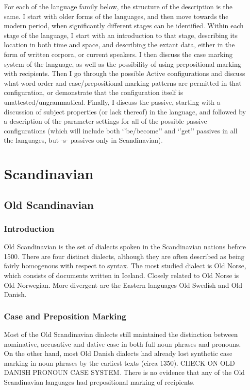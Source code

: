 For each of the language family below, the structure of the description is the same. I start with older forms of the languages, and then move towards the modern period, when significantly different stages can be identified. Within each stage of the language, I start with an introduction to that stage, describing its location in both time and space, and describing the extant data, either in the form of written corpora, or current speakers. I then discuss the case marking system of the language, as well as the possibility of using prepositional marking with recipients. Then I go through the possible Active configurations and discuss what word order and case/prepositional marking patterns are permitted in that configuration, or demonstrate that the configuration itself is unattested/ungrammatical. Finally, I discuss the passive, starting with a discussion of subject properties (or lack thereof) in the language, and followed by a description of the parameter settings for all of the possible passive configurations (which will include both `'be/become'' and `'get'' passives in all the languages, but -s- passives only in Scandinavian).
\chapter{Scandinavian}
\section{Old Scandinavian}\label{sec:OldScand}

\subsection{Introduction}
Old Scandinavian is the set of dialects spoken in the Scandinavian nations before 1500. There are four distinct dialects, although they are often described as being fairly homogenous with respect to syntax. The most studied dialect is Old Norse, which consists of documents written in Iceland. Closely related to Old Norse is Old Norwegian. More divergent are the Eastern languages Old Swedish and Old Danish.
\subsection{Case and Preposition Marking}
Most of the Old Scandinavian dialects still maintained the distinction between nominative, accusative and dative case in both full noun phrases and pronouns. On the other hand, most Old Danish dialects had already lost synthetic case marking in noun phrases by the earliest texts (circa 1350). CHECK ON OLD DANISH PRONOUN CASE SYSTEM. There is no evidence that any of the Old Scandinavian languages had prepositional marking of recipients.

